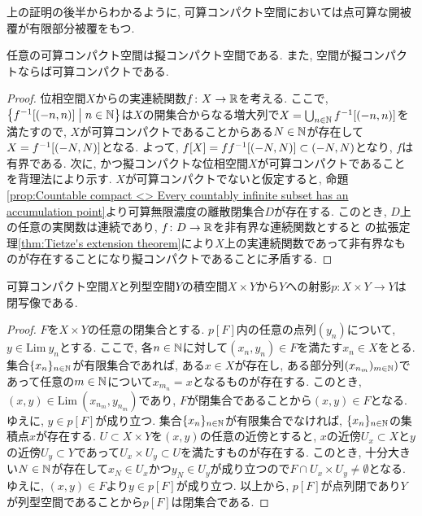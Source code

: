 \documentclass[uplatex, dvipdfmx, a4paper, 12pt, class=jsbook, crop=false]{standalone}
\begin{document}
上の証明の後半からわかるように, 可算コンパクト空間においては点可算な開被覆が有限部分被覆をもつ.

\begin{proposition}
	任意の可算コンパクト空間は擬コンパクト空間である. また,  空間が擬コンパクトならば可算コンパクトである.
\end{proposition}
\begin{proof}
	位相空間$ X $からの実連続関数$ f \colon X \to \mathbb{R} $を考える. ここで, $ \setcomp{f^{-1}[\intoo{-n}{n}]}{n \in \N} $は$ X $の開集合からなる増大列で$ X = \bigcup_{n \in \mathbb{N}} f^{-1}[\left( -n , n \right)] $を満たすので, $ X $が可算コンパクトであることからある$ N \in \mathbb{N} $が存在して$ X = f^{-1}[\left( -N , N \right)] $となる. よって, $ f[X] = ff^{-1}[\left( -N , N \right)] \subset \left( -N , N \right) $となり, $ f $は有界である. 次に,  かつ擬コンパクトな位相空間$ X $が可算コンパクトであることを背理法により示す. $ X $が可算コンパクトでないと仮定すると, 命題\ref{prop:Countable compact <> Every countably infinite subset has an accumulation point}より可算無限濃度の離散閉集合$ D $が存在する. このとき, $ D $上の任意の実関数は連続であり, $ f \colon D \to \mathbb{R} $を非有界な連続関数とすると \Tietze の拡張定理\ref{thm:Tietze's extension theorem}により$ X $上の実連続関数であって非有界なものが存在することになり擬コンパクトであることに矛盾する.
\end{proof}

\begin{proposition}
	\label{prop:The projection from the Cartesian product of a countably compact space X and a sequential space Y to Y is closed}
	可算コンパクト空間$ X $と列型空間$ Y $の積空間$ X \times Y $から$ Y $への射影$ p \colon X \times Y \to Y $は閉写像である.
\end{proposition}

\begin{proof}
	$ F $を$ X \times Y $の任意の閉集合とする. $ p[F] $内の任意の点列$ (y_n) $について, $ y \in \mathrm{Lim} \ y_n $とする. ここで, 各$ n \in \mathbb{N} $に対して$ (x_n, y_n) \in F $を満たす$ x_n \in X $をとる. 集合$ \{x_n \}_{n \in \mathbb{N}} $が有限集合であれば, ある$ x \in X $が存在し, ある部分列$ (x_{n_m})_{m \in \mathbb{N}}) $であって任意の$ m \in \mathbb{N} $について$ x_{m_n} = x $となるものが存在する. このとき, $ (x, y) \in \mathrm{Lim} \ (x_{n_m}, y_{n_m}) $であり, $ F $が閉集合であることから$ (x, y) \in F $となる. ゆえに, $ y \in p[F] $が成り立つ. 集合$ \{x_n \}_{n \in \mathbb{N}} $が有限集合でなければ, $ \{x_n \}_{n \in \mathbb{N}} $の集積点$ x $が存在する. $ U \subset X \times Y $を$ (x, y) $の任意の近傍とすると, $ x $の近傍$ U_x \subset X $と$ y $の近傍$ U_y \subset Y $であって$ U_x \times U_y \subset U $を満たすものが存在する. このとき, 十分大きい$ N \in \mathbb{N} $が存在して$ x_N \in U_x $かつ$ y_N \in U_y $が成り立つので$ F \cap U_x \times U_y \neq \emptyset $となる. ゆえに, $ (x, y) \in F $より$ y \in p[F] $が成り立つ. 以上から, $ p[F] $が点列閉であり$ Y $が列型空間であることから$ p[F] $は閉集合である.
\end{proof}
\end{document}
